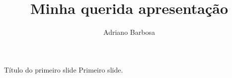\documentclass{beamer}
\author{Adriano Barbosa}
\title{Minha querida apresentação}
\begin{document}
\begin{frame}
	\maketitle
\end{frame}

\begin{frame}{Título do primeiro slide}
	Primeiro slide.
\end{frame}
\end{document}
